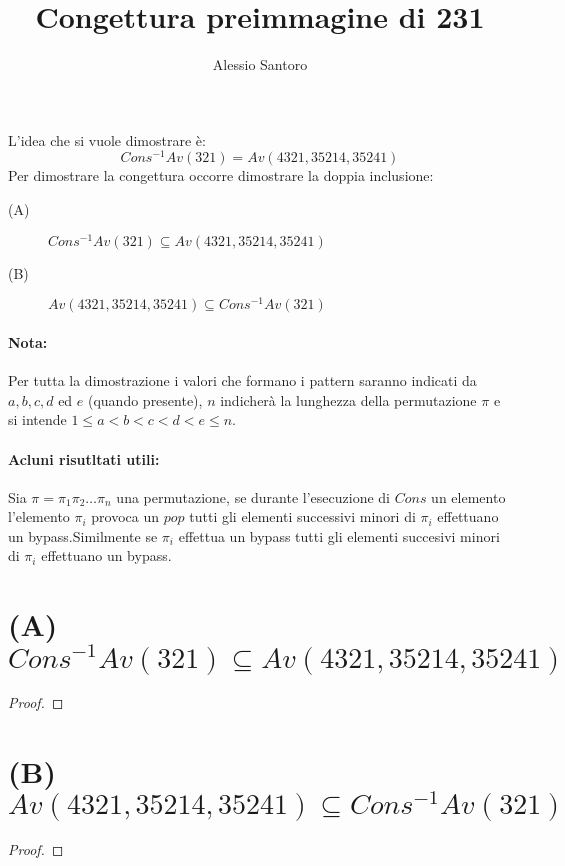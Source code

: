 \documentclass[10pt,a4paper]{article}
\author{Alessio Santoro}
\title{Congettura preimmagine di 231}
\date{}
\begin{document}
\maketitle
L'idea che si vuole dimostrare è:
$$Cons^{-1}Av(321) = Av(4321, 35214, 35241)$$
Per dimostrare la congettura occorre dimostrare la doppia inclusione:
\begin{description}
\item[(A)]$Cons^{-1}Av(321) \subseteq Av(4321, 35214, 35241)$
\item[(B)]$Av(4321, 35214, 35241) \subseteq Cons^{-1}Av(321)$
\end{description}
\paragraph*{Nota:}Per tutta la dimostrazione i valori che formano i pattern saranno indicati da $a,b,c,d$ ed $e$ (quando presente), $n$ indicherà la lunghezza della permutazione $\pi$ e si intende $1\leq{a}<b<c<d<e\leq{n}$.
\paragraph*{Acluni risutltati utili:} Sia $\pi=\pi_1\pi_2\dots\pi_n$ una permutazione, se durante l'esecuzione di $Cons$ un elemento l'elemento $\pi_i$ provoca un $pop$ tutti gli elementi successivi minori di $\pi_i$ effettuano un bypass.Similmente se $\pi_i$ effettua un bypass tutti gli elementi succesivi minori di $\pi_i$ effettuano un bypass.
\section*{(A) $Cons^{-1}Av(321)  \subseteq Av(4321, 35214, 35241)$}
\begin{proof}
\end{proof}
\section*{(B) $Av(4321, 35214, 35241) \subseteq Cons^{-1}Av(321)$}
\begin{proof}

\end{proof}
\end{document}
